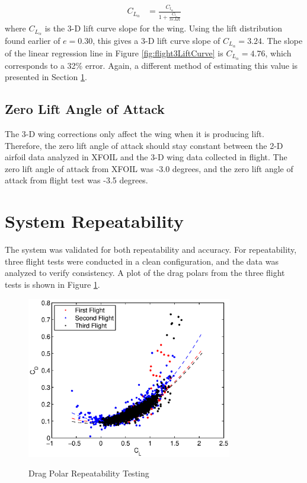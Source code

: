 \begin{align}
\label{eqn:3dCorrections}
C_{L_\alpha} &= \frac{C_{l_\alpha}}{1+\frac{C_{l_\alpha}}{\pi e AR}}
\end{align}
where $C_{L_\alpha}$ is the 3-D lift curve slope for the wing. Using the lift distribution found earlier of $e = 0.30$, this gives a 3-D lift curve slope of $C_{L_\alpha} = 3.24$. The slope of the linear regression line in Figure \ref{fig:flight3LiftCurve} is $C_{L_\alpha} = 4.76$, which corresponds to a 32\% error. Again, a different method of estimating this value is presented in Section \ref{sect:sysRepeat}.
\subsection{Zero Lift Angle of Attack}
The 3-D wing corrections only affect the wing when it is producing lift. Therefore, the zero lift angle of attack should stay constant between the 2-D airfoil data analyzed in XFOIL and the 3-D wing data collected in flight. The zero lift angle of attack from XFOIL was -3.0 degrees, and the zero lift angle of attack from flight test was -3.5 degrees.
	
\section{System Repeatability}
\label{sect:sysRepeat}
The system was validated for both repeatability and accuracy. For repeatability, three flight tests were conducted in a clean configuration, and the data was analyzed to verify consistency. A plot of the drag polars from the three flight tests is shown in Figure \ref{fig:dPolarRepeatClean}.

\begin{figure}[H]
  \centering
    \includegraphics[width=0.8\textwidth]{figures/dPolarRepeatClean.eps}\  \caption{Drag Polar Repeatability Testing} \label{fig:dPolarRepeatClean}
\end{figure}

